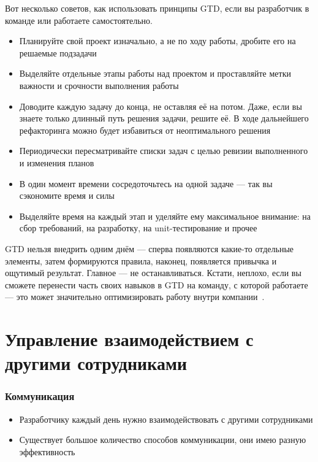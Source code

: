 \documentclass{../industrial-development}
\begin{document}
\lecturenotes

Вот несколько советов, как использовать принципы GTD, если вы разработчик в команде или работаете самостоятельно.

  \begin{itemize}
  \item Планируйте свой проект изначально, а не по ходу работы, дробите его на решаемые подзадачи
  \item Выделяйте отдельные этапы работы над проектом и проставляйте метки важности и срочности выполнения работы
  \item Доводите каждую задачу до конца, не оставляя её на потом. Даже, если вы знаете только длинный путь решения задачи, решите её. В ходе дальнейшего рефакторинга можно будет избавиться от неоптимального решения
  \item Периодически пересматривайте списки задач с целью ревизии выполненного и изменения планов
  \item В один момент времени сосредоточьтесь на одной задаче — так вы сэкономите время и силы
  \item Выделяйте время на каждый этап и уделяйте ему максимальное внимание: на сбор требований, на разработку, на unit-тестирование и прочее
  \end{itemize}

GTD нельзя внедрить одним днём — сперва появляются какие-то отдельные элементы, затем формируются правила, наконец, появляется привычка и ощутимый результат. Главное — не останавливаться. Кстати, неплохо, если вы сможете перенести часть своих навыков в GTD на команду, с которой работаете — это может значительно оптимизировать работу внутри компании~\cite{GTDHabr}.

\section{Управление взаимодействием с другими сотрудниками}

\begin{frame} \frametitle{Коммуникация}
  \begin{itemize}
  \item Разработчику каждый день нужно взаимодействовать с другими сотрудниками
  \item Существует большое количество способов коммуникации, они имею разную эффективность
  \end{itemize}
\end{frame}
\end{document}

